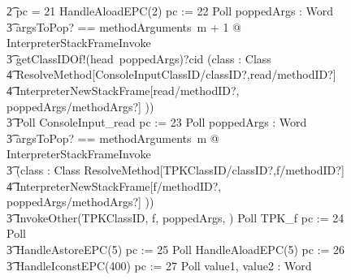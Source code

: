 \begin{figure}[t]
\begin{circus}
    \t2 {} \circelse pc = 21 \circthen HandleAloadEPC(2) \circseq pc := 22 \circseq Poll \circseq \circvar poppedArgs : \seq Word \circspot \\
    \t3 \lschexpract \exists argsToPop?  == methodArguments~m + 1 @ InterpreterStackFrameInvoke \rschexpract \circseq \\
    \t3 getClassIDOf!(head~poppedArgs)?cid \then (\circvar class : Class \circspot \\
    \t4 \lschexpract ResolveMethod[ConsoleInputClassID/classID?,read/methodID?] \rschexpract \circseq \\
    \t4 \lschexpract InterpreterNewStackFrame[read/methodID?, poppedArgs/methodArgs?] \rschexpract)) \\
    \t3 Poll \circseq ConsoleInput\_read \circseq pc := 23 \circseq Poll \circseq \circvar poppedArgs : \seq Word \circspot \\
    \t3 \lschexpract \exists argsToPop? == methodArguments~m @ InterpreterStackFrameInvoke \rschexpract \circseq \\
    \t3 (\circvar class : Class \circspot \lschexpract ResolveMethod[TPKClassID/classID?,f/methodID?] \rschexpract \circseq \\
    \t4 \lschexpract InterpreterNewStackFrame[f/methodID?, poppedArgs/methodArgs?] \rschexpract)) \\
    \t3 InvokeOther(TPKClassID, f, poppedArgs, \true) \circseq Poll \circseq TPK\_f \circseq pc := 24 \circseq Poll \circseq \\
    \t3 HandleAstoreEPC(5) \circseq pc := 25 \circseq Poll \circseq HandleAloadEPC(5) \circseq pc := 26 \circseq \\
    \t3 HandleIconstEPC(400) \circseq pc := 27 \circseq Poll \circseq \circvar value1, value2 : Word \circspot \\

\end{circus}
\end{figure}
